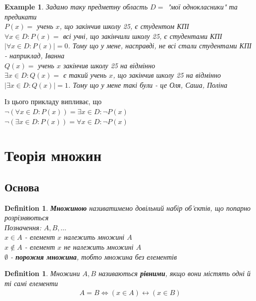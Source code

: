 \documentclass[a4paper, 14pt]{extarticle}
\theoremstyle{theoremdd}
\theoremstyle{theoremdd}
\newtheorem{definition}[theorem]{Definition}
\theoremstyle{theoremdd}
\theoremstyle{theoremdd}
\newtheorem{example}[theorem]{Example}
\theoremstyle{theoremdd}
\theoremstyle{theoremdd}
\theoremstyle{theoremdd}
\theoremstyle{theoremdd}
\begin{document}
\begin{example}
Задамо таку предметну область $D = $ "мої однокласники" та предикати\\
$P(x) = $ учень $x$, що закінчив школу 25, є студентом КПІ\\
$\forall x \in D: P(x) = $ всі учні, що закінчили школу 25, є студентами КПІ\\
$|\forall x \in D: P(x)| = 0$. Тому що у мене, насправді, не всі стали студентами КПІ - наприклад, Іванна\\
$Q(x) = $ учень $x$ закінчив школу 25 на відмінно\\
$\exists x \in D: Q(x) =$ є такий учень $x$, що закінчив школу 25 на відмінно\\
$|\exists x \in D: Q(x)| = 1$. Тому що у мене такі були - це Оля, Саша, Поліна
\end{example}

Із цього прикладу випливає, що\\
$\neg (\forall x \in D: P(x)) = \exists x \in D: \neg P(x)$\\
$\neg (\exists x \in D: P(x)) = \forall x \in D: \neg P(x)$\\
\newpage

\section{Теорія множин}
\subsection{Основа}
\begin{definition}
\textbf{Множиною} називатимемо довільний набір об'єктів, що попарно розрізняються\\
Позначення: $A,B,\dots$
\bigskip \\
$x \in A$ - елемент $x$ належить множині $A$\\
$x \not\in A$ - елемент $x$ не належить множині $A$\\
$\emptyset$ - \textbf{порожня множина}, тобто множина без елементів
\end{definition}

\begin{definition}
Множини $A,B$ називаються \textbf{рівними}, якщо вони містять одні й ті самі елементи
\begin{align*}
A = B \iff (x \in A) \leftrightarrow (x \in B)
\end{align*}
\end{definition}
\end{document}
